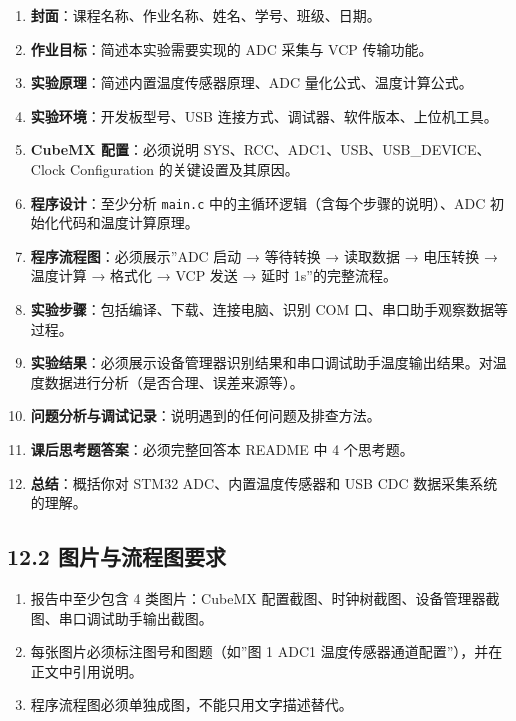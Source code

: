 \documentclass[
  chinese,
  UTF8,
  oneside,
  openany]{ctexbook}
\providecommand{\tightlist}{%
  \setlength{\itemsep}{0pt}\setlength{\parskip}{0pt}}
\begin{document}
\begin{enumerate}
\def\labelenumi{\arabic{enumi}.}
\tightlist
\item
  \textbf{封面}：课程名称、作业名称、姓名、学号、班级、日期。
\item
  \textbf{作业目标}：简述本实验需要实现的 ADC 采集与 VCP 传输功能。
\item
  \textbf{实验原理}：简述内置温度传感器原理、ADC
  量化公式、温度计算公式。
\item
  \textbf{实验环境}：开发板型号、USB
  连接方式、调试器、软件版本、上位机工具。
\item
  \textbf{CubeMX 配置}：必须说明 SYS、RCC、ADC1、USB、USB\_DEVICE、Clock
  Configuration 的关键设置及其原因。
\item
  \textbf{程序设计}：至少分析 \texttt{main.c}
  中的主循环逻辑（含每个步骤的说明）、ADC 初始化代码和温度计算原理。
\item
  \textbf{程序流程图}：必须展示''ADC 启动 → 等待转换 → 读取数据 →
  电压转换 → 温度计算 → 格式化 → VCP 发送 → 延时 1s''的完整流程。
\item
  \textbf{实验步骤}：包括编译、下载、连接电脑、识别 COM
  口、串口助手观察数据等过程。
\item
  \textbf{实验结果}：必须展示设备管理器识别结果和串口调试助手温度输出结果。对温度数据进行分析（是否合理、误差来源等）。
\item
  \textbf{问题分析与调试记录}：说明遇到的任何问题及排查方法。
\item
  \textbf{课后思考题答案}：必须完整回答本 README 中 4 个思考题。
\item
  \textbf{总结}：概括你对 STM32 ADC、内置温度传感器和 USB CDC
  数据采集系统的理解。
\end{enumerate}

\subsection{12.2
图片与流程图要求}\label{ux56feux7247ux4e0eux6d41ux7a0bux56feux8981ux6c42-4}

\begin{enumerate}
\def\labelenumi{\arabic{enumi}.}
\tightlist
\item
  报告中至少包含 4 类图片：CubeMX
  配置截图、时钟树截图、设备管理器截图、串口调试助手输出截图。
\item
  每张图片必须标注图号和图题（如''图 1 ADC1
  温度传感器通道配置''），并在正文中引用说明。
\item
  程序流程图必须单独成图，不能只用文字描述替代。
\end{enumerate}
\end{document}
